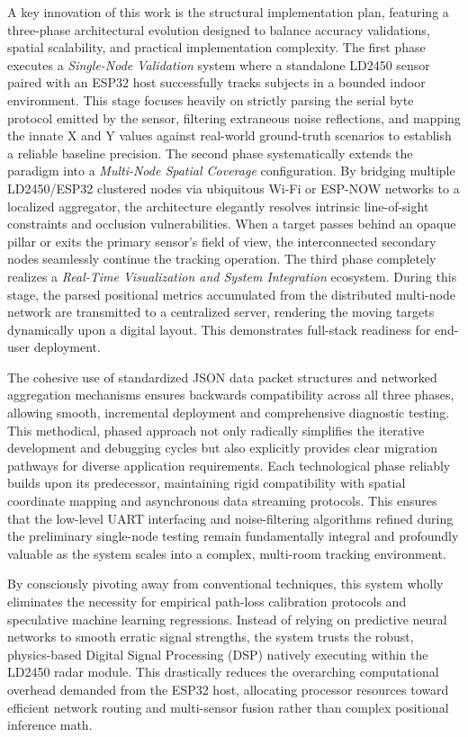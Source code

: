 A key innovation of this work is the structural implementation plan, featuring a three-phase architectural evolution designed to balance accuracy validations, spatial scalability, and practical implementation complexity. The first phase executes a \textit{Single-Node Validation} system where a standalone LD2450 sensor paired with an ESP32 host successfully tracks subjects in a bounded indoor environment. This stage focuses heavily on strictly parsing the serial byte protocol emitted by the sensor, filtering extraneous noise reflections, and mapping the innate X and Y values against real-world ground-truth scenarios to establish a reliable baseline precision. The second phase systematically extends the paradigm into a \textit{Multi-Node Spatial Coverage} configuration. By bridging multiple LD2450/ESP32 clustered nodes via ubiquitous Wi-Fi or ESP-NOW networks to a localized aggregator, the architecture elegantly resolves intrinsic line-of-sight constraints and occlusion vulnerabilities. When a target passes behind an opaque pillar or exits the primary sensor's field of view, the interconnected secondary nodes seamlessly continue the tracking operation. The third phase completely realizes a \textit{Real-Time Visualization and System Integration} ecosystem. During this stage, the parsed positional metrics accumulated from the distributed multi-node network are transmitted to a centralized server, rendering the moving targets dynamically upon a digital layout. This demonstrates full-stack readiness for end-user deployment.\par

The cohesive use of standardized JSON data packet structures and networked aggregation mechanisms ensures backwards compatibility across all three phases, allowing smooth, incremental deployment and comprehensive diagnostic testing. This methodical, phased approach not only radically simplifies the iterative development and debugging cycles but also explicitly provides clear migration pathways for diverse application requirements. Each technological phase reliably builds upon its predecessor, maintaining rigid compatibility with spatial coordinate mapping and asynchronous data streaming protocols. This ensures that the low-level UART interfacing and noise-filtering algorithms refined during the preliminary single-node testing remain fundamentally integral and profoundly valuable as the system scales into a complex, multi-room tracking environment.\par

By consciously pivoting away from conventional techniques, this system wholly eliminates the necessity for empirical path-loss calibration protocols and speculative machine learning regressions. Instead of relying on predictive neural networks to smooth erratic signal strengths, the system trusts the robust, physics-based Digital Signal Processing (DSP) natively executing within the LD2450 radar module. This drastically reduces the overarching computational overhead demanded from the ESP32 host, allocating processor resources toward efficient network routing and multi-sensor fusion rather than complex positional inference math.\par

